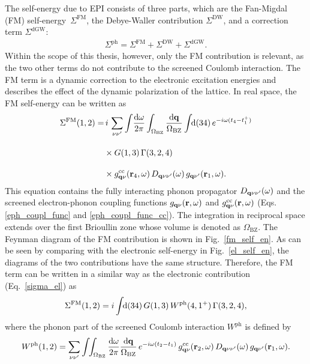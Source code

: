 The self-energy due to EPI consists of three parts, which are the Fan-Migdal (FM) self-energy~$\Sigma^\text{FM}$, the Debye-Waller contribution $\Sigma^\text{DW}$, and a correction term $\Sigma^\text{dGW}$\cite{Giustino}:
%
\begin{align}
    \Sigma^\text{ph} = \Sigma^\text{FM} + \Sigma^\text{DW} +\Sigma^\text{dGW}.
\end{align}
%
Within the scope of this thesis, however, only the FM contribution is relevant, as the two other terms do not contribute to the screened Coulomb interaction. The FM term is a dynamic correction to the electronic excitation energies and describes the effect of the dynamic polarization of the lattice. In real space, the FM self-energy can be written as\cite{Giustino}
%
\begin{equation}\label{fmreal}
\begin{aligned}
        \Sigma^\text{FM}(1,2) = & \, i\, \sum_{\nu\nu'}\int\!\frac{\text{d}\omega}{2\pi}\int_{\Omega_\text{BZ}}\frac{\text{d}\mathbf{q}}{\Omega_\text{BZ}}\int\text{\!\!d}(34)\,e^{-i\omega(t_4-t_1^+)}\\[10pt]\, &  \times G(1,3)\,\Gamma(3,2,4) \\[10pt]
        & \times g^\text{cc}_{\mathbf{q}\nu}(\mathbf{r}_4,\omega)\, D_{\mathbf{q}\nu\nu'}(\omega)\,g_{\mathbf{q}\nu'}(\mathbf{r}_1,\omega).
\end{aligned}
\end{equation}
%
This equation contains the fully interacting phonon propagator $D_{\mathbf{q}\nu\nu'}(\omega)$ and the screened electron-phonon coupling functions $g_{\mathbf{q}\nu}(\mathbf{r},\omega)$ and $g^\text{cc}_{\mathbf{q}\nu}(\mathbf{r},\omega)$ (Eqs.\;\eqref{eph_coupl_func} and \eqref{eph_coupl_func_cc}). The integration in reciprocal space extends over the first Brioullin zone whose volume is denoted as $\Omega_\text{BZ}$. The Feynman diagram of the FM contribution is shown in Fig.~\ref{fm_self_en}. As can be seen by comparing with the electronic self-energy in Fig.~\ref{el_self_en}, the diagrams of the two contributions have the same structure. Therefore, the FM term can be written in a similar way as the electronic contribution (Eq.~\eqref{sigma_el}) as
%
\begin{equation}\label{fm_gw}
    \Sigma^\text{FM}(1,2) = i\int\text{\!\!d}(34)\,G(1,3)\,W^\text{ph}(4,1^+)\,\Gamma(3,2,4),\\[10pt]
\end{equation}
%
where the phonon part of the screened Coulomb interaction $W^\text{ph}$ is defined by
%
\begin{equation}\label{wph_time_domain}
      W^\text{ph}(1,2) =  \sum_{\nu\nu'}\int\!\!\int_{\Omega_\text{BZ}}\frac{\text{d}\omega}{2\pi}\frac{\text{d}\mathbf{q}}{\Omega_\text{BZ}}\,e^{-i\omega(t_2-t_1)}\,
 g^\text{cc}_{\mathbf{q}\nu}(\mathbf{r}_2,\omega)\, D_{\mathbf{q}\nu\nu'}(\omega)\,g_{\mathbf{q}\nu'}(\mathbf{r}_1,\omega).
\end{equation}
